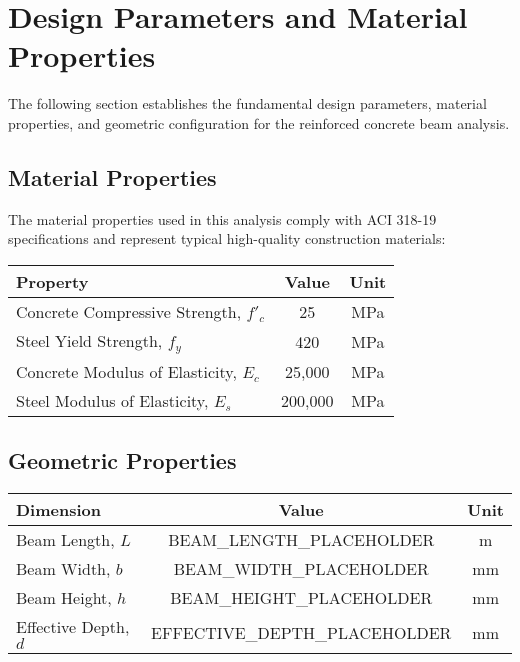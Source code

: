 \documentclass[
  11pt,
  letterpaper,
  onecolumn
]{article}
\begin{document}
\newpage

\section{Design Parameters and Material Properties}

The following section establishes the fundamental design parameters, material properties, and geometric configuration for the reinforced concrete beam analysis.

\subsection{Material Properties}

The material properties used in this analysis comply with ACI 318-19 specifications and represent typical high-quality construction materials:

\begin{center}
\renewcommand{\arraystretch}{1.3}
\begin{tabular}{l c c}
\toprule
\textbf{Property} & \textbf{Value} & \textbf{Unit} \\
\midrule
Concrete Compressive Strength, $f'_c$ & 25 & MPa \\
Steel Yield Strength, $f_y$ & 420 & MPa \\
Concrete Modulus of Elasticity, $E_c$ & 25,000 & MPa \\
Steel Modulus of Elasticity, $E_s$ & 200,000 & MPa \\
\bottomrule
\end{tabular}
\end{center}

\subsection{Geometric Properties}

\begin{center}
\renewcommand{\arraystretch}{1.3}
\begin{tabular}{l c c}
\toprule
\textbf{Dimension} & \textbf{Value} & \textbf{Unit} \\
\midrule
Beam Length, $L$ & BEAM_LENGTH_PLACEHOLDER & m \\
Beam Width, $b$ & BEAM_WIDTH_PLACEHOLDER & mm \\
Beam Height, $h$ & BEAM_HEIGHT_PLACEHOLDER & mm \\
Effective Depth, $d$ & EFFECTIVE_DEPTH_PLACEHOLDER & mm \\
\bottomrule
\end{tabular}
\end{center}
\end{document}
